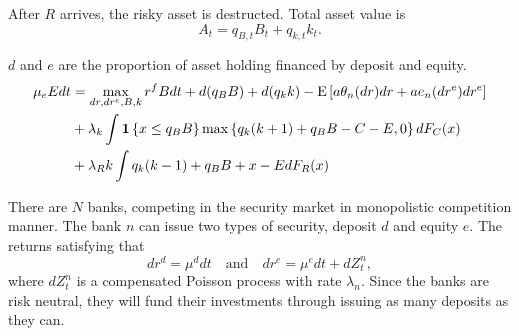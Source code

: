 \documentclass[a4paper, 12pt]{article}
\begin{document}
After $R$ arrives, the risky asset is destructed. Total asset value is 
\begin{equation}
    A_t = q_{B,t}B_t + q_{k,t}k_t. 
\end{equation}

$d$ and $e$ are the proportion of asset holding financed by deposit 
and equity. 
\begin{equation}
    \begin{split}
        \mu_eEdt &= \max_{dr,dr^e,B,k} r^fBdt + d(q_BB) + d(q_kk) - {\operatorname{E}}\left[ {a\theta_n(dr)dr + ae_n(dr^e)dr^e} \right] \\
        &+ \lambda_k\int\mathbf{1}\left\{ {x\leq q_BB} \right\}\max\left\{ {q_k(k+1)+q_BB - C - E, 0} \right\}dF_C(x)\\ 
        &+ \lambda_Rk\int q_k(k-1) + q_BB + x - EdF_R(x)
    \end{split}
\end{equation}

There are $N$ banks, competing in the security market in monopolistic 
competition manner. The bank $n$ can issue two types of security,  
deposit $d$ and equity $e$. The returns satisfying that 
\begin{equation*}
    dr^d = \mu^ddt
    \quad\text{and}\quad 
    dr^e = \mu^edt + dZ_t^n, 
\end{equation*}
where $dZ_t^n$ is a compensated Poisson process with rate 
$\lambda_n$. Since the banks are risk neutral, they will 
fund their investments through issuing as many deposits as 
they can.




\end{document}
